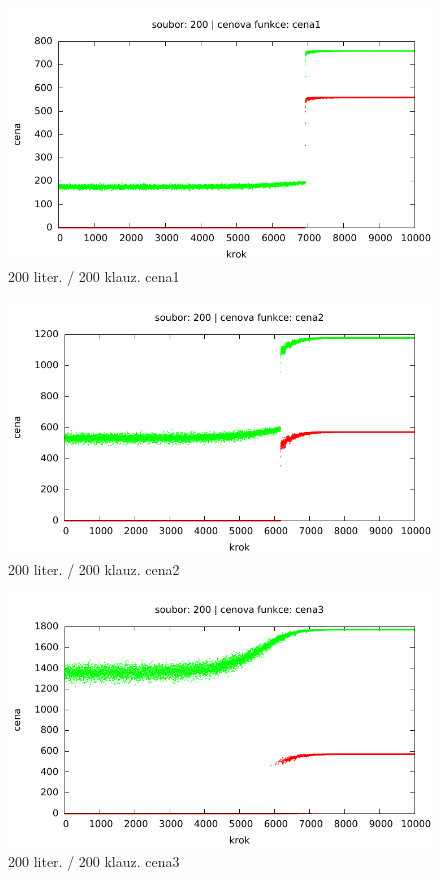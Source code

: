 \documentclass[12pt,a4paper]{article}
\begin{document}
\begin{figure}[H]
	\caption{200 liter. / 200 klauz. cena1}
 	\centerline{\includegraphics{"../results/200cost1"}}
\end{figure}
\begin{figure}[H]
	\caption{200 liter. / 200 klauz. cena2}
 	\centerline{\includegraphics{"../results/200cost2"}}
\end{figure}
\begin{figure}[H]
	\caption{200 liter. / 200 klauz. cena3}
 	\centerline{\includegraphics{"../results/200cost3"}}
\end{figure}
\end{document}
